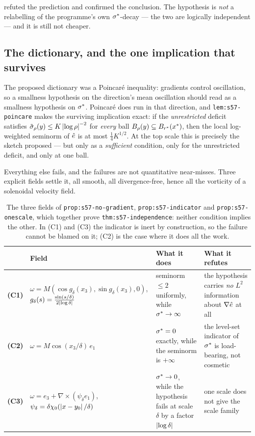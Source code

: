  refuted the prediction and confirmed the conclusion. The hypothesis is
\emph{not} a relabelling of the programme's own \(\sigma^{*}\)-decay --- the two are
logically independent --- and it is still not cheaper.

\subsection{The dictionary, and the one implication that survives}

The proposed dictionary was a Poincar\'e inequality: gradients control
oscillation, so a smallness hypothesis on the direction's mean oscillation
should read as a smallness hypothesis on \(\sigma^{*}\). Poincar\'e does run in that
direction, and \texttt{lem:s57-poincare} makes the surviving implication exact:
if the \emph{unrestricted} deficit satisfies
\(\tilde\sigma_\rho(y)\leq K\left|\log\rho\right|^{-2}\) for \emph{every} ball
\(B_\rho(y)\subseteq B_{r^{*}}(x^*)\), then the local log-weighted seminorm of
\(\hat{e}\) is at most \(\tfrac14K^{1/2}\). At the top scale this is precisely the
sketch  proposed --- but only as a \emph{sufficient} condition, only for
the unrestricted deficit, and only at one ball.

Everything else fails, and the failures are not quantitative near-misses. Three
explicit fields settle it, all smooth, all divergence-free, hence all the
vorticity of a solenoidal velocity field.

\begin{table}[ht]
\centering
\small
\begin{tabular}{@{}l >{\raggedright\arraybackslash}p{}
                     >{\raggedright\arraybackslash}p{}
                     >{\raggedright\arraybackslash}p{}@{}}
\toprule
& Field & What it does & What it refutes \\
\midrule
\textbf{(C1)}
  & \(\omega=M(\cos g_\delta(x_3),\sin g_\delta(x_3),0)\),
    \(g_\delta(s)=\frac{\sin(s/\delta)}{2\left|\log\delta\right|}\)
  & seminorm \(\leq2\) uniformly, while \(\sigma^{*}\to\infty\)
  & the hypothesis carries \emph{no} \(L^2\) information about
    \(\nabla\hat{e}\) at all \\[10pt]
\textbf{(C2)}
  & \(\omega=M\cos(x_3/\delta)\,e_1\)
  & \(\sigma^{*}=0\) exactly, while the seminorm is \(+\infty\)
  & the level-set indicator of \(\sigma^{*}\) is load-bearing, not cosmetic \\[10pt]
\textbf{(C3)}
  & \(\omega=e_3+\nabla\times(\psi_\delta e_1)\),
    \(\psi_\delta=\delta\chi_0(\left|x-y_0\right|/\delta)\)
  & \(\sigma^{*}\to0\), while the hypothesis fails at scale \(\delta\) by a factor
    \(\left|\log\delta\right|\)
  & one scale does not give the scale family \\
\bottomrule
\end{tabular}
\caption[The three counterexamples]{The three fields of
\texttt{prop:s57-no-gradient}, \texttt{prop:s57-indicator} and
\texttt{prop:s57-onescale}, which together prove
\texttt{thm:s57-independence}: neither condition implies the other. In (C1) and
(C3) the indicator is inert by construction, so the failure cannot be blamed on
it; (C2) is the case where it does all the work.}
\label{tab:pt-counterexamples}
\end{table}

